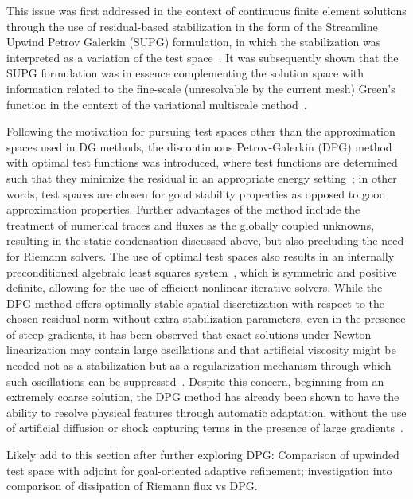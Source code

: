 \documentclass[12pt,Bold,letterpaper,TexShade]{mcgilletdclass}
\numberwithin{equation}{section}
\begin{document}
This issue was first addressed in the context of continuous finite element solutions through the use of residual-based stabilization in the form of the Streamline Upwind Petrov Galerkin (SUPG) formulation, in which the stabilization was interpreted as a variation of the test space~\cite{brooks1982}. It was subsequently shown that the SUPG formulation was in essence complementing the solution space with information related to the fine-scale (unresolvable by the current mesh) Green's function in the context of the variational multiscale method~\cite{hughes1998,hughes2007}.

Following the motivation for pursuing test spaces other than the approximation spaces used in DG methods, the discontinuous Petrov-Galerkin (DPG) method with optimal test functions was introduced, where test functions are determined such that they minimize the residual in an appropriate energy setting~\cite{demkowicz2010,demkowicz2011}; in other words, test spaces are chosen for good stability properties as opposed to good approximation properties. Further advantages of the method include the treatment of numerical traces and fluxes as the globally coupled unknowns, resulting in the static condensation discussed above, but also precluding the need for Riemann solvers. The use of optimal test spaces also results in an internally preconditioned algebraic least squares system~\cite{chan2014}, which is symmetric and positive definite, allowing for the use of efficient nonlinear iterative solvers. While the DPG method offers optimally stable spatial discretization with respect to the chosen residual norm without extra stabilization parameters, even in the presence of steep gradients, it has been observed that exact solutions under Newton linearization may contain large oscillations and that artificial viscosity might be needed not as a stabilization but as a regularization mechanism through which such oscillations can be suppressed~\cite{chan_thesis}. Despite this concern, beginning from an extremely coarse solution, the DPG method has already been shown to have the ability to resolve physical features through automatic adaptation, without the use of artificial diffusion or shock capturing terms in the presence of large gradients~\cite{chan2014}.

{\color{red} Likely add to this section after further exploring DPG: Comparison of upwinded test space with adjoint for goal-oriented adaptive refinement; investigation into comparison of dissipation of Riemann flux vs DPG.}

\end{document}
